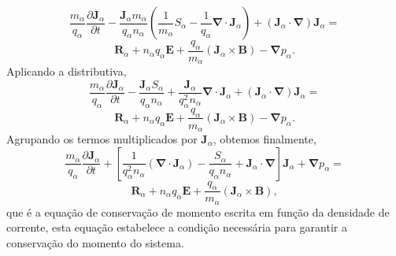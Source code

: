 \documentclass[12pt,oneside,a4paper]{abntex2}
\begin{document}
\begin{equation}
\label{eq: pit23.7}
\frac{m_\alpha}{q_\alpha} \frac{\partial \bm{J}_\alpha}{\partial t} -\frac{\bm{J}_\alpha m_\alpha}{q_\alpha n_\alpha} \left( \frac{1}{m_\alpha} S_\alpha -\frac{1}{q_\alpha} \bm{\nabla} \cdot \bm{J}_\alpha  \right)  + (\bm{J}_\alpha \cdot \bm{\nabla})\bm{J}_\alpha =
\end{equation}
\begin{equation*}
 \bm{R}_\alpha+n_\alpha q_\alpha \bm{E} + \frac{q_\alpha}{m_\alpha} (\bm{J}_\alpha \times \bm{B}) -\bm{\nabla} p_\alpha.
\end{equation*}
Aplicando a distributiva,
\begin{equation}
\label{eq: pit23.800}
\frac{m_\alpha}{q_\alpha} \frac{\partial \bm{J}_\alpha}{\partial t} -\frac{\bm{J}_\alpha S_\alpha}{q_\alpha n_\alpha}+ \frac{\bm{J}_\alpha}{q^2_\alpha n_\alpha} \bm{\nabla} \cdot \bm{J}_\alpha   + (\bm{J}_\alpha \cdot \bm{\nabla})\bm{J}_\alpha =
\end{equation}
\begin{equation*}
 \bm{R}_\alpha+n_\alpha q_\alpha \bm{E} + \frac{q_\alpha}{m_\alpha} (\bm{J}_\alpha \times \bm{B}) -\bm{\nabla} p_\alpha.
\end{equation*}
Agrupando os termos multiplicados por $\bm{J}_\alpha$, obtemos finalmente,
\begin{equation}
\label{eq: pit23.80}
\frac{m_\alpha}{q_\alpha} \frac{\partial \bm{J}_\alpha}{\partial t} + \left[ \frac{1}{q^2_\alpha n_\alpha} ( \bm{\nabla} \cdot \bm{J}_\alpha ) -\frac{S_\alpha}{q_\alpha n_\alpha} + \bm{J}_\alpha \cdot \bm{\nabla} \right] \bm{J}_\alpha  +\bm{\nabla} p_\alpha=
\end{equation}
\begin{equation*}
 \bm{R}_\alpha+n_\alpha q_\alpha \bm{E} + \frac{q_\alpha}{m_\alpha} (\bm{J}_\alpha \times \bm{B}),
\end{equation*}
que é a equação de conservação de momento escrita em função da densidade de corrente, esta equação estabelece a condição necessária para garantir a conservação do momento do sistema.
\end{document}
